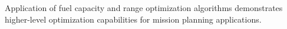 Application of fuel capacity and range optimization algorithms demonstrates higher-level optimization capabilities for mission planning applications.